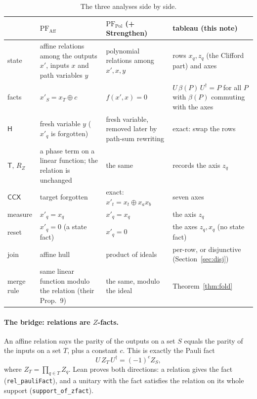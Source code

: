 \documentclass[11pt]{article}
\theoremstyle{definition}
\theoremstyle{remark}
\newcommand{\adj}{^{\dagger}}
\newcommand{\back}{\beta}
\newcommand{\gate}[1]{\mathsf{#1}}
\begin{document}
\begin{table}[h]
\centering
\small
\renewcommand{\arraystretch}{1.25}
\begin{tabular}{@{}p{2.3cm}p{3.9cm}p{3.6cm}p{4.2cm}@{}}
\toprule
 & $\mathrm{PF}_{\mathrm{Aff}}$ & $\mathrm{PF}_{\mathrm{Pol}}$ (+ Strengthen) & tableau (this note) \\
\midrule
state & affine relations among the outputs $x'$, inputs $x$ and path variables $y$ & polynomial
relations among $x', x, y$ & rows $x_q, z_q$ (the Clifford part) and axes \\
facts & $x'_S = x_T \oplus c$ & $f(x', x) = 0$ & $U\,\back(P)\,U\adj = P$ for all $P$ with
$\back(P)$ commuting with the axes \\
$\gate H$ & fresh variable $y$ ($x'_q$ is forgotten) & fresh variable, removed later by
path-sum rewriting & exact: swap the rows \\
$\gate T$, $R_Z$ & a phase term on a linear function; the relation is unchanged & the same &
records the axis $z_q$ \\
$\gate{CCX}$ & target forgotten & exact: $x'_t = x_t \oplus x_ax_b$ & seven axes \\
measure & $x'_q = x_q$ & $x'_q = x_q$ & the axis $z_q$ \\
reset & $x'_q = 0$ (a state fact) & $x'_q = 0$ & the axes $z_q, x_q$ (no state fact) \\
join & affine hull & product of ideals & per-row, or disjunctive (Section~\ref{sec:disj}) \\
merge rule & same linear function modulo the relation (their Prop.~9) & the same, modulo the
ideal & Theorem~\ref{thm:fold} \\
\bottomrule
\end{tabular}
\caption{The three analyses side by side.}
\label{tab:al}
\end{table}

\paragraph{The bridge: relations are $Z$-facts.}
An affine relation says the parity of the outputs on a set $S$ equals the parity of the
inputs on a set $T$, plus a constant $c$. This is exactly the Pauli fact
\[
  U\, Z_T\, U\adj = (-1)^c Z_S ,
\]
where $Z_T = \prod_{q \in T} Z_q$. Lean proves both directions: a relation gives the fact
(\texttt{rel\_pauliFact}), and a unitary with the fact satisfies the relation on its whole
support (\texttt{support\_of\_zfact}).
\end{document}
